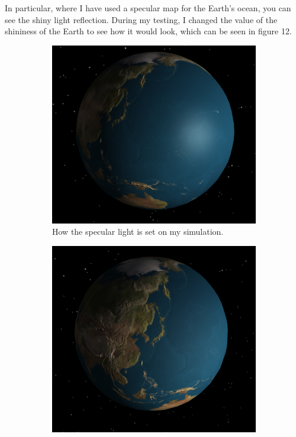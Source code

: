 \documentclass[12pt]{article}
\begin{document}
In particular, where I have used a specular map for the Earth's ocean, you can see the shiny light reflection. During my testing, I changed the value of the shininess of the Earth to see how it would look, which can be seen in figure 12.

 \begin{figure}[H]
        \centering
        \begin{subfigure}[b]{0.3\textwidth}
                \includegraphics[width=\textwidth]{images/specular1}
                \caption{How the specular light is set on my simulation.}
                \label{fig:Specular 1.}
	 \end{subfigure}
        \begin{subfigure}[b]{0.3\textwidth}
                \includegraphics[width=\textwidth]{images/specular2}

\end{subfigure}
\end{figure}
\end{document}
